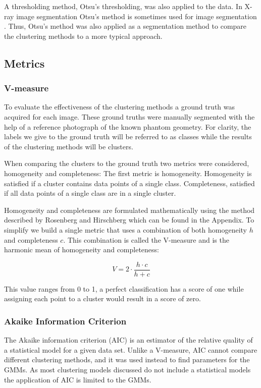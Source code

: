 \documentclass[a4paper,11pt]{article}
\begin{document}
A thresholding method, Otsu's thresholding, was also applied to the data. In X-ray image segmentation Otsu's method \cite{Otsu1979AHistograms} is sometimes used for image segmentation \cite{Sund2003AnImaging}. Thus, Otsu's method was also applied as a segmentation method to compare the clustering methods to a more typical approach.

\subsection{Metrics}
\subsubsection{V-measure}

To evaluate the effectiveness of the clustering methods a ground truth was acquired for each image. These ground truths were manually segmented with the help of a reference photograph of the known phantom geometry. For clarity, the labels we give to the ground truth will be referred to as classes while the results of the clustering methods will be clusters.

When comparing the clusters to the ground truth two metrics were considered, homogeneity and completeness: The first metric is homogeneity. Homogeneity is satisfied if a cluster contains data points of a single class. Completeness, satisfied if all data points of a single class are in a single cluster. 

Homogeneity and completeness are formulated mathematically using the method described by Rosenberg and Hirschberg \cite{Rosenberg2007V-Measure:Measure} which can be found in the Appendix. To simplify we build a single metric that uses a combination of both homogeneity $h$ and completeness $c$. This combination is called the V-measure and is the harmonic mean of homogeneity and completeness:


\begin{equation}
V = 2 \cdot \frac{h \cdot c}{h + c}
\end{equation}

This value ranges from 0 to 1, a perfect classification has a score of one while assigning each point to a cluster would result in a score of zero.

\subsubsection{Akaike Information Criterion}

The Akaike information criterion (AIC) \cite{Akaike1998InformationPrinciple} is an estimator of the relative quality of a statistical model for a given data set. Unlike a V-measure, AIC cannot compare different clustering methods, and it was used instead to find parameters for the GMMs. As most clustering models discussed do not include a statistical models the application of AIC is limited to the GMMs.
\end{document}
